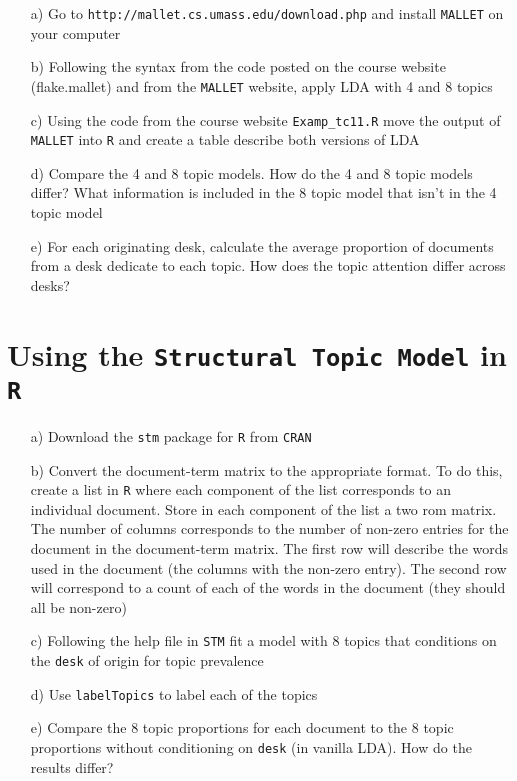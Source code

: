\documentclass[12pt,letterpaper]{article}
\begin{document}
\begin{itemize}
\item[a)] Go to {\tt http://mallet.cs.umass.edu/download.php} and install {\tt MALLET} on your computer
\item[b)] Following the syntax from the code posted on the course website (flake.mallet) and from the {\tt MALLET} website, apply LDA with 4 and 8 topics
\item[c)] Using the code from the course website {\tt Examp\_tc11.R} move the output of {\tt MALLET} into {\tt R} and create a table describe both versions of LDA
\item[d)] Compare the 4 and 8 topic models.  How do the 4 and 8 topic models differ?  What information is included in the 8 topic model that isn't in the 4 topic model
\item[e)] For each originating desk, calculate the average proportion of documents from a desk dedicate to each topic.  How does the topic attention differ across desks?
\end{itemize}


\section{Using the {\tt Structural Topic Model} in {\tt R}}

\begin{itemize}
\item[a)] Download the {\tt stm} package for {\tt R} from {\tt CRAN}
\item[b)] Convert the document-term matrix to the appropriate format.  To do this, create a list in {\tt R} where each component of the list corresponds to an individual document.  Store in each component of the list a two rom matrix.  The number of columns corresponds to the number of non-zero entries for the document in the document-term matrix.  The first row will describe the words used in the document (the columns with the non-zero entry).  The second row will correspond to a count of each of the words in the document (they should all be non-zero)
\item[c)] Following the help file in {\tt STM} fit a model with 8 topics that conditions on the {\tt desk} of origin for topic prevalence
\item[d)] Use {\tt labelTopics} to label each of the topics
\item[e)] Compare the 8 topic proportions for each document to the 8 topic proportions without conditioning on {\tt desk} (in vanilla LDA).  How do the results differ?
\end{itemize}
\end{document}
